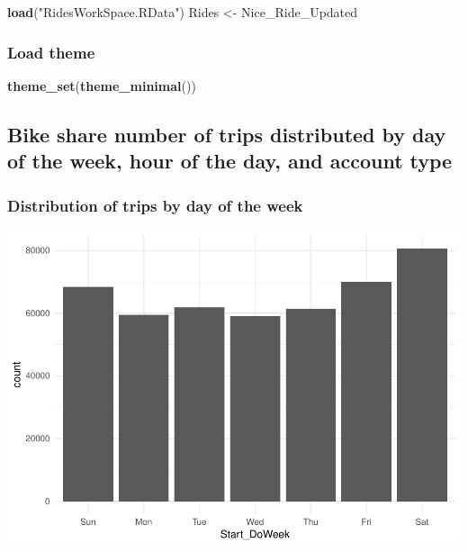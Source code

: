 \documentclass[]{article}
\newenvironment{Shaded}{\begin{snugshade}}{\end{snugshade}}
\newcommand{\KeywordTok}[1]{\textcolor[rgb]{0.13,0.29,0.53}{\textbf{#1}}}
\newcommand{\StringTok}[1]{\textcolor[rgb]{0.31,0.60,0.02}{#1}}
\newcommand{\OperatorTok}[1]{\textcolor[rgb]{0.81,0.36,0.00}{\textbf{#1}}}
\newcommand{\NormalTok}[1]{#1}
\begin{document}
\begin{Shaded}
\begin{Highlighting}[]
\KeywordTok{load}\NormalTok{(}\StringTok{"RidesWorkSpace.RData"}\NormalTok{)}
\NormalTok{Rides <-}\StringTok{ }\NormalTok{Nice_Ride_Updated}
\end{Highlighting}
\end{Shaded}

\subsubsection{Load theme}\label{load-theme}

\begin{Shaded}
\begin{Highlighting}[]
\KeywordTok{theme_set}\NormalTok{(}\KeywordTok{theme_minimal}\NormalTok{())}
\end{Highlighting}
\end{Shaded}

\subsection{Bike share number of trips distributed by day of the week,
hour of the day, and account
type}\label{bike-share-number-of-trips-distributed-by-day-of-the-week-hour-of-the-day-and-account-type}

\subsubsection{Distribution of trips by day of the
week}\label{distribution-of-trips-by-day-of-the-week}

\begin{Shaded}
\end{Shaded}

\includegraphics{Nice_Ride_Project_Stat_ReportDRAFT_files/figure-latex/unnamed-chunk-4-1.pdf}
\end{document}
